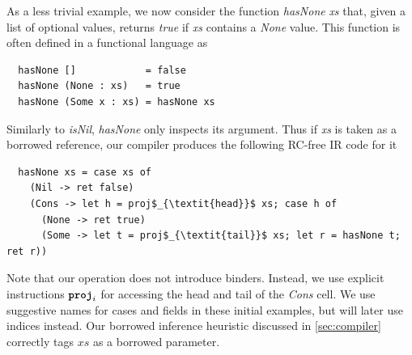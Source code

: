 As a less trivial example, we now consider the function \textit{hasNone} \textit{xs} that,
given a list of optional values, returns \emph{true} if \textit{xs} contains a \textit{None} value.
This function is often defined in a functional language as
\begin{lstlisting}
  hasNone []            = false
  hasNone (None : xs)   = true
  hasNone (Some x : xs) = hasNone xs
\end{lstlisting}
Similarly to \textit{isNil}, \textit{hasNone} only inspects its argument. Thus if \textit{xs} is taken
as a borrowed reference, our compiler produces the following RC-free IR code for it
\begin{lstlisting}
  hasNone xs = case xs of
    (Nil -> ret false)
    (Cons -> let h = proj$_{\textit{head}}$ xs; case h of
      (None -> ret true)
      (Some -> let t = proj$_{\textit{tail}}$ xs; let r = hasNone t; ret r))
\end{lstlisting}
Note that our  operation does not introduce binders. Instead, we use explicit instructions $\texttt{\textbf{proj}}_i$ for
accessing the head and tail of the \textit{Cons} cell. We use suggestive names
for cases and fields in these initial examples, but will later use indices instead.
Our borrowed inference heuristic discussed in \cref{sec:compiler} correctly tags $\textit{xs}$ as a borrowed parameter.

